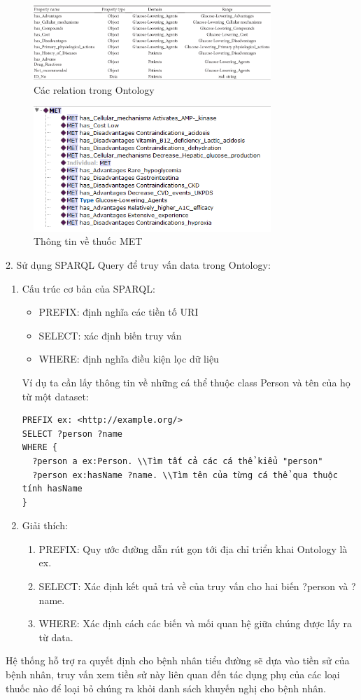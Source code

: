 \documentclass{article}
\begin{document}
\begin{figure}[H]
    \centering
    \includegraphics[width=0.8\textwidth]{o4.png}
    \caption{Các relation trong Ontology}
    \label{dongco}
\end{figure}
\begin{figure}[H]
    \centering
    \includegraphics[width=0.8\textwidth]{o5.png}
    \caption{Thông tin về thuốc MET}
    \label{dongco}
\end{figure}
2. Sử dụng SPARQL Query để truy vấn data trong Ontology:
\begin{enumerate}
    \item Cấu trúc cơ bản của SPARQL: \begin{itemize}
        \item PREFIX: định nghĩa các tiền tố URI
        \item SELECT: xác định biến truy vấn
        \item WHERE: định nghĩa điều kiện lọc dữ liệu
    \end{itemize}
Ví dụ ta cần lấy thông tin về những cá thể thuộc class Person và tên của họ từ một dataset:
\begin{verbatim}
PREFIX ex: <http://example.org/>
SELECT ?person ?name
WHERE {
  ?person a ex:Person. \\Tìm tất cả các cá thể kiểu "person"
  ?person ex:hasName ?name. \\Tìm tên của từng cá thể qua thuộc tính hasName
}
    \end{verbatim}
    \item Giải thích: \begin{enumerate}
        \item PREFIX: Quy ước đường dẫn rút gọn tới địa chỉ triển khai Ontology là ex.
        \item SELECT: Xác định kết quả trả về của truy vấn cho hai biến ?person và ?name.
        \item WHERE: Xác định cách các biến và mối quan hệ giữa chúng được lấy ra từ data.
    \end{enumerate}
\end{enumerate}
Hệ thống hỗ trợ ra quyết định cho bệnh nhân tiểu đường sẽ dựa vào tiền sử của bệnh nhân, truy vấn xem tiền sử này liên quan
đến tác dụng phụ của các loại thuốc nào để loại bỏ chúng ra khỏi danh sách khuyến nghị cho bệnh nhân.
\end{document}
